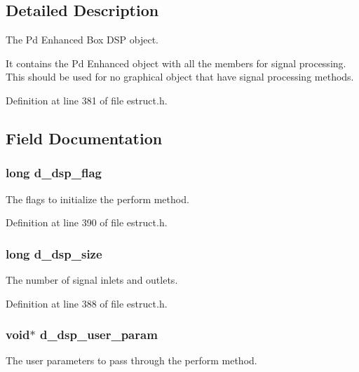 \subsection{Detailed Description}
The Pd Enhanced Box D\-S\-P object. 

It contains the Pd Enhanced object with all the members for signal processing. This should be used for no graphical object that have signal processing methods. 

Definition at line 381 of file estruct.\-h.



\subsection{Field Documentation}
\hypertarget{struct__edspobj_af3409f354253e5753dbba6b22472972e}{
\subsubsection[{d\-\_\-dsp\-\_\-flag}]{\setlength{\rightskip}{0pt plus 5cm}long d\-\_\-dsp\-\_\-flag}}\label{struct__edspobj_af3409f354253e5753dbba6b22472972e}
The flags to initialize the perform method. 

Definition at line 390 of file estruct.\-h.

\hypertarget{struct__edspobj_a0bb016ebe02ce3d3a0965a19c1d8476d}{
\subsubsection[{d\-\_\-dsp\-\_\-size}]{\setlength{\rightskip}{0pt plus 5cm}long d\-\_\-dsp\-\_\-size}}\label{struct__edspobj_a0bb016ebe02ce3d3a0965a19c1d8476d}
The number of signal inlets and outlets. 

Definition at line 388 of file estruct.\-h.

\hypertarget{struct__edspobj_ab056760f93f95b4edc3a8dddd0b5b62f}{
\subsubsection[{d\-\_\-dsp\-\_\-user\-\_\-param}]{\setlength{\rightskip}{0pt plus 5cm}void$\ast$ d\-\_\-dsp\-\_\-user\-\_\-param}}\label{struct__edspobj_ab056760f93f95b4edc3a8dddd0b5b62f}
The user parameters to pass through the perform method. 

